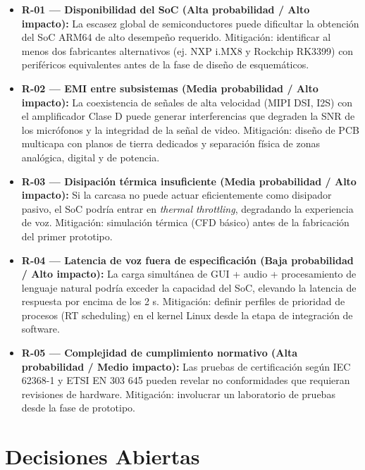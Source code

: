 \documentclass[%
	paper=a4,
	twoside=false,
	parskip=half,
	chapterprefix=false,
	10pt,
	headings=normal,
	bibliography=totoc,
	listof=totoc,
	titlepage=on,
	captions=tableabove,
	draft=false, 
]{scrbook}%
\begin{document}
\begin{itemize}
    \item \textbf{R-01 — Disponibilidad del SoC (Alta probabilidad / Alto impacto):} La escasez global de semiconductores puede dificultar la obtención del SoC ARM64 de alto desempeño requerido. Mitigación: identificar al menos dos fabricantes alternativos (ej. NXP i.MX8 y Rockchip RK3399) con periféricos equivalentes antes de la fase de diseño de esquemáticos.
    \item \textbf{R-02 — EMI entre subsistemas (Media probabilidad / Alto impacto):} La coexistencia de señales de alta velocidad (MIPI DSI, I2S) con el amplificador Clase D puede generar interferencias que degraden la SNR de los micrófonos y la integridad de la señal de video. Mitigación: diseño de PCB multicapa con planos de tierra dedicados y separación física de zonas analógica, digital y de potencia.
    \item \textbf{R-03 — Disipación térmica insuficiente (Media probabilidad / Alto impacto):} Si la carcasa no puede actuar eficientemente como disipador pasivo, el SoC podría entrar en \textit{thermal throttling}, degradando la experiencia de voz. Mitigación: simulación térmica (CFD básico) antes de la fabricación del primer prototipo.
    \item \textbf{R-04 — Latencia de voz fuera de especificación (Baja probabilidad / Alto impacto):} La carga simultánea de GUI + audio + procesamiento de lenguaje natural podría exceder la capacidad del SoC, elevando la latencia de respuesta por encima de los 2 s. Mitigación: definir perfiles de prioridad de procesos (RT scheduling) en el kernel Linux desde la etapa de integración de software.
    \item \textbf{R-05 — Complejidad de cumplimiento normativo (Alta probabilidad / Medio impacto):} Las pruebas de certificación según IEC 62368-1 y ETSI EN 303 645 pueden revelar no conformidades que requieran revisiones de hardware. Mitigación: involucrar un laboratorio de pruebas desde la fase de prototipo.
\end{itemize}

\section{Decisiones Abiertas}
\end{document}
